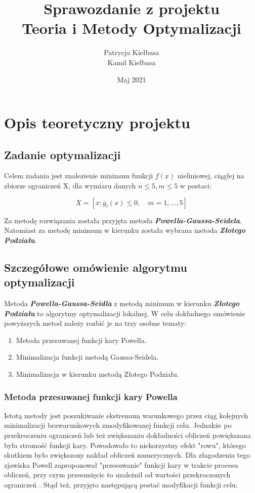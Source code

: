 \documentclass[a4paper,12pt]{article}
\title{\textbf{Sprawozdanie z projektu} \\ Teoria i Metody Optymalizacji}
\author{Patrycja Kiełbasa \\ Kamil Kiełbasa}
\date{Maj 2021}
\begin{document}
\maketitle
\tableofcontents

\newpage
\section{Opis teoretyczny projektu}
\subsection{Zadanie optymalizacji}
Celem zadania jest znalezienie minimum funkcji $f(x)$ nieliniowej, ciągłej na zbiorze ograniczeń X, dla wymiaru danych $n \leq 5, m \leq 5$ w postaci:

\begin{equation} \label{eq:1}
X = [x: g_i(x) \leq 0, \quad m = 1, ... , 5]
\end{equation}

Za metodę rozwiązania została przyjęta metoda \textit{\textbf{Powella-Gaussa-Seidela}}. Natomiast za metodę minimum w kierunku została wybrana metoda \textit{\textbf{Złotego Podziału}}.

\subsection{Szczegółowe omówienie algorytmu optymalizacji}
Metoda  \textit{\textbf{Powella-Gaussa-Seidla}} z metodą minimum w kierunku  \textit{\textbf{Złotego Podziału}} to algorytmy optymalizacji lokalnej. W celu dokładnego omówienie powyższych metod należy rozbić je na trzy osobne tematy:

\begin{enumerate}
    \item Metoda przesuwanej funkcji kary Powella.
    \item Minimalizacja funkcji metodą Gaussa-Seidela.
    \item Minimalizacja w kierunku metodą Złotego Podziału.
\end{enumerate}

\subsubsection{Metoda przesuwanej funkcji kary Powella}
Istotą metody jest poszukiwanie ekstremum warunkowego przez ciąg kolejnych minimalizacji bezwarunkowych zmodyfikowanej funkcji celu. Jednakże po przekroczeniu ograniczeń lub też zwiększaniu dokładności obliczeń powiększana była stromość funkcji kary. Powodowało to niekorzystny efekt "rowu", którego skutkiem było zwiększony nakład obliczeń numerycznych. Dla złagodzenia tego zjawiska Powell zaproponował "przesuwanie" funkcji kary w trakcie procesu obliczeń, przy czym przesunięcie to uzależnił od wartości przekroczonych ograniczeń \cite{bibitem1}. Stąd też, przyjęto następującą postać modyfikacji funkcji celu:
\end{document}
